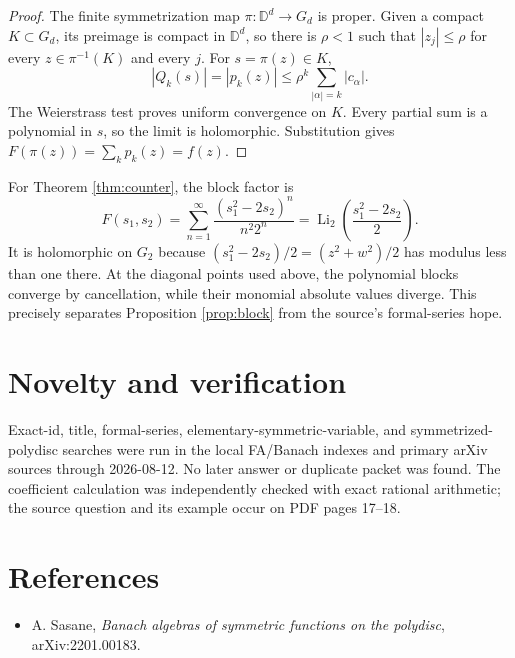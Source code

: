 \documentclass[11pt]{article}
\newcommand{\D}{\mathbb D}
\begin{document}
\begin{proof}
The finite symmetrization map $\pi:\D^d\to G_d$ is proper.  Given a compact
$K\subset G_d$, its preimage is compact in $\D^d$, so there is $\rho<1$
such that $|z_j|\le\rho$ for every $z\in\pi^{-1}(K)$ and every $j$.
For $s=\pi(z)\in K$,
\[
 |Q_k(s)|=|p_k(z)|
 \le\rho^k\sum_{|\alpha|=k}|c_\alpha|.
\]
The Weierstrass test proves uniform convergence on $K$.  Every partial sum
is a polynomial in $s$, so the limit is holomorphic.  Substitution gives
$F(\pi(z))=\sum_kp_k(z)=f(z)$.
\end{proof}

For Theorem \ref{thm:counter}, the block factor is
\[
 F(s_1,s_2)=\sum_{n=1}^{\infty}
 \frac{(s_1^2-2s_2)^n}{n^2 2^n}
 =\operatorname{Li}_2\!\left(\frac{s_1^2-2s_2}{2}\right).
\]
It is holomorphic on $G_2$ because
$(s_1^2-2s_2)/2=(z^2+w^2)/2$ has modulus less than one there.  At the
diagonal points used above, the polynomial blocks converge by cancellation,
while their monomial absolute values diverge.  This precisely separates
Proposition \ref{prop:block} from the source's formal-series hope.

\section*{Novelty and verification}

Exact-id, title, formal-series, elementary-symmetric-variable, and
symmetrized-polydisc searches were run in the local FA/Banach indexes and
primary arXiv sources through 2026-08-12.  No later answer or duplicate
packet was found.  The coefficient calculation was independently checked
with exact rational arithmetic; the source question and its example occur
on PDF pages 17--18.

\section*{References}

\begin{itemize}
\item A. Sasane, \emph{Banach algebras of symmetric functions on the
polydisc}, arXiv:2201.00183.
\end{itemize}
\end{document}
